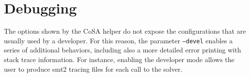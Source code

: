 \documentclass{article}
\theoremstyle{definition}
\begin{document}
\section{Debugging}
\label{sec:debugging}

The options shown by the CoSA helper do not expose the configurations
that are usually used by a developer. For this reason, the parameter
\texttt{--devel} enables a series of additional behaviors, including
also a more detailed error printing with stack trace information. For
instance, enabling the developer mode allows the user to produce smt2
tracing files for each call to the solver.

\newpage


\end{document}
